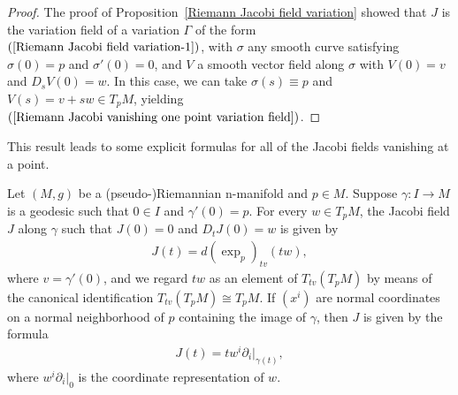 \begin{proof}
The proof of Proposition~\ref{Riemann Jacobi field variation} showed that $J$ is the variation field of a variation $\Gamma$ of the form $(\ref{Riemann Jacobi field variation-1})$, 
with $\sigma$ any smooth curve satisfying $\sigma(0)=p$ and $\sigma'(0)=0$, and $V$ a smooth vector field along $\sigma$ with $V(0)=v$ and $D_sV(0)=w$. In this case, we 
can take $\sigma(s)\equiv p$ and $V(s)=v+sw\in T_pM$, yielding $(\ref{Riemann Jacobi vanishing one point variation field})$.
\end{proof}
This result leads to some explicit formulas for all of the Jacobi fields vanishing
at a point.
\begin{proposition}\label{Riemann Jacobi vanishing one point}
Let $(M,g)$ be a (pseudo-)Riemannian n-manifold and $p\in M$. Suppose $\gamma:I\to M$ is a geodesic such that $0\in I$ and $\gamma'(0)=p$. For every $w\in T_pM$, 
the Jacobi field $J$ along $\gamma$ such that $J(0)=0$ and $D_tJ(0)=w$ is given by
\begin{align}\label{Riemann Jacobi vanishing one point expression}
J(t)=d(\exp_p)_{tv}(tw),
\end{align}
where $v=\gamma'(0)$, and we regard $tw$ as an element of $T_{tv}(T_pM)$ by means of the canonical identification $T_{tv}(T_pM)\cong T_pM$. If $(x^i)$ are normal 
coordinates on a normal neighborhood of $p$ containing the image of $\gamma$, then $J$ is given by the formula
\begin{align}\label{Riemann Jacobi vanishing one point coordinate form}
J(t)=tw^i\partial_i|_{\gamma(t)},
\end{align}
where $w^i\partial_i|_0$ is the coordinate representation of $w$.
\end{proposition}

